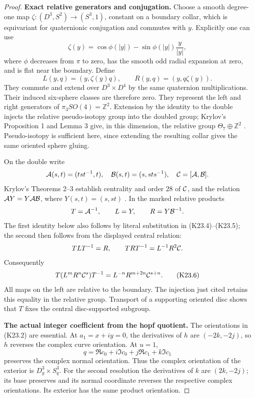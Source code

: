 \begin{proof}
\par\medskip\noindent\textbf{Exact relative generators and conjugation.}\enspace
Choose a smooth degree-one map
\(\zeta:(D^3,S^2)\to(S^3,1)\), constant on a boundary collar,
which is equivariant for quaternionic conjugation and commutes
with \(y\). Explicitly one can use
\[
 \zeta(y)=\cos\phi(|y|)-\sin\phi(|y|)\frac{y}{|y|},
\]
where \(\phi\) decreases from \(\pi\) to zero, has the smooth odd
radial expansion at zero, and is flat near the boundary. Define
\[
 L(y,q)=(y,\zeta(y)q),\qquad R(y,q)=(y,q\zeta(y)).
                                                        \tag{K23.5}
\]
They commute and extend over \(D^3\times D^4\) by the same quaternion
multiplications. Their induced six-sphere classes are therefore zero.
They represent the left and right generators of
\(\pi_3SO(4)=\mathbb Z^2\). Extension by the identity to the double
injects the relative pseudo-isotopy group into the doubled group;
Krylov's Proposition 1 and Lemma 3 give, in this dimension, the
relative group \(\Theta _7\oplus\mathbb Z^2\)
\cite{Krylov2004}. Pseudo-isotopy is sufficient here, since extending
the resulting collar gives the same oriented sphere gluing.

On the double write
\[
 {\cal A}(s,t)=(tst^{-1},t),\quad
 {\cal B}(s,t)=(s,sts^{-1}),\quad
 {\cal C}=[{\cal A},{\cal B}].
\]
Krylov's Theorems 2--3 establish centrality and order \(28\) of
\({\cal C}\), and the relation
\({\cal A}Y=Y{\cal A}{\cal B}\), where \(Y(s,t)=(s,st)\)
\cite{Krylov2001}. In the marked relative products
\[
       T={\cal A}^{-1},\qquad L=Y,\qquad
       R=Y{\cal B}^{-1}.
\]
The first identity below also follows by literal substitution in
(K23.4)--(K23.5); the second then follows from the displayed central
relation:
\[
 TLT^{-1}=R,\qquad
 TRT^{-1}=L^{-1}R^2{\cal C}.
\]
Consequently
\[
 T(L^mR^n{\cal C}^s)T^{-1}
       =L^{-n}R^{m+2n}{\cal C}^{s+n}.                \tag{K23.6}
\]
All maps on the left are relative to the boundary. The injection
just cited retains this equality in the relative group. Transport
of a supporting oriented disc shows that \(T\) fixes the central
disc-supported subgroup.

\par\medskip\noindent\textbf{The actual integer coefficient from the hopf quotient.}\enspace
The orientations in (K23.2) are essential. At \(a_1=x+iy=0\),
the derivatives of \(h\) are \((-2k,-2j)\), so \(h\) reverses the
complex curve orientation. At \(u=1\),
\[
 q=\Re c_0+i\Im c_0+j\Re c_1+k\Im c_1
\]
preserves the complex normal orientation. Thus the complex
orientation of the exterior is \(D^3_y\times S^3_q\).
For the second resolution the derivatives of \(k\) are \((2k,-2j)\);
its base preserves and its normal coordinate reverses the respective
complex orientations. Its exterior has the same product orientation.


\end{proof}
